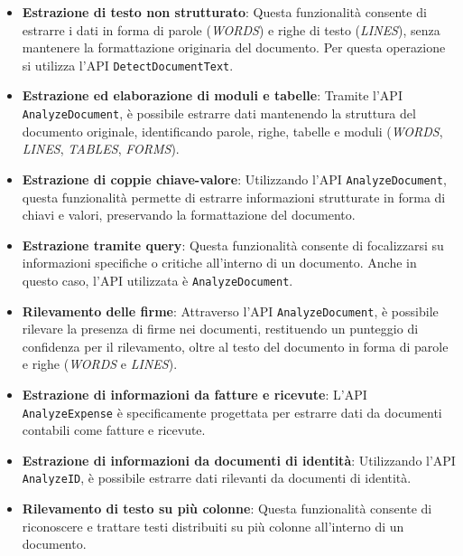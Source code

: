 \begin{itemize}
    \item \textbf{Estrazione di testo non strutturato}: Questa funzionalità consente di estrarre i dati in forma di parole (\textit{WORDS}) e righe di testo (\textit{LINES}), senza mantenere la formattazione originaria del documento. Per questa operazione si utilizza l'API \texttt{DetectDocumentText}.
    
    \item \textbf{Estrazione ed elaborazione di moduli e tabelle}: Tramite l'API \texttt{AnalyzeDocument}, è possibile estrarre dati mantenendo la struttura del documento originale, identificando parole, righe, tabelle e moduli (\textit{WORDS}, \textit{LINES}, \textit{TABLES}, \textit{FORMS}).
    
    \item \textbf{Estrazione di coppie chiave-valore}: Utilizzando l'API \texttt{AnalyzeDocument}, questa funzionalità permette di estrarre informazioni strutturate in forma di chiavi e valori, preservando la formattazione del documento.
    
    \item \textbf{Estrazione tramite query}: Questa funzionalità consente di focalizzarsi su informazioni specifiche o critiche all'interno di un documento. Anche in questo caso, l'API utilizzata è \texttt{AnalyzeDocument}.
    
    \item \textbf{Rilevamento delle firme}: Attraverso l'API \texttt{AnalyzeDocument}, è possibile rilevare la presenza di firme nei documenti, restituendo un punteggio di confidenza per il rilevamento, oltre al testo del documento in forma di parole e righe (\textit{WORDS} e \textit{LINES}).
    
    \item \textbf{Estrazione di informazioni da fatture e ricevute}: L'API \texttt{AnalyzeExpense} è specificamente progettata per estrarre dati da documenti contabili come fatture e ricevute.
    
    \item \textbf{Estrazione di informazioni da documenti di identità}: Utilizzando l'API \texttt{AnalyzeID}, è possibile estrarre dati rilevanti da documenti di identità.
    
    \item \textbf{Rilevamento di testo su più colonne}: Questa funzionalità consente di riconoscere e trattare testi distribuiti su più colonne all'interno di un documento.
\end{itemize}

